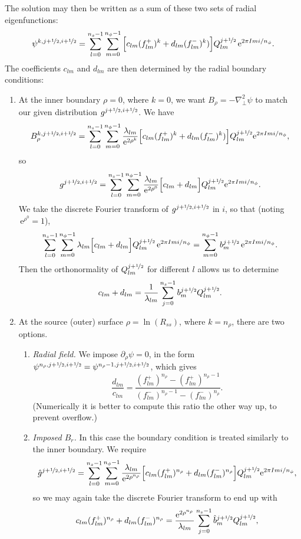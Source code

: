 \documentclass[11pt]{article}
\newcommand{\dy}{\partial}
\newcommand{\nr}{n_\rho}
\newcommand{\ns}{n_s}
\newcommand{\nph}{n_\phi}
\newcommand{\half}{\nicefrac{1}{2}}
\newcommand{\ex}{\,\mathrm{e}}
\begin{document}
The solution may then be written as a sum of these two sets of radial eigenfunctions:
\begin{equation}
\psi^{k,j+\half,i+\half} = \sum_{l=0}^{\ns-1}\sum_{m=0}^{\nph-1}\Big[c_{lm}(f_{lm}^+)^k + d_{lm}(f_{lm}^-)^k) \Big] Q_{lm}^{j+\half}\ex^{2\pi I mi/\nph}.
\label{eqn:psisum}
\end{equation}
The coefficients $c_{lm}$ and $d_{lm}$ are then determined by the radial boundary conditions:
\begin{enumerate}
\item At the inner boundary $\rho = 0$, where $k=0$, we want  $B_\rho = -\nabla^2_\perp\psi$ to match our given distribution $g^{j+\half,i+\half}$.
We have
\[
B_\rho^{k,j+\half,i+\half} = \sum_{l=0}^{\ns-1}\sum_{m=0}^{\nph-1}\frac{\lambda_{lm}}{\mathrm{e}^{2\rho^k}}\Big[c_{lm}(f_{lm}^+)^k + d_{lm}(f_{lm}^-)^k) \Big] Q_{lm}^{j+\half}\mathrm{e}^{2\pi I mi/\nph},
\]
so
\[
g^{j+\half,i+\half} = \sum_{l=0}^{\ns-1}\sum_{m=0}^{\nph-1}\frac{\lambda_{lm}}{\mathrm{e}^{2\rho^0}}\Big[c_{lm} + d_{lm}\Big] Q_{lm}^{j+\half}\mathrm{e}^{2\pi I mi/\nph}.
\]
We take the discrete Fourier transform of $g^{j+\half,i+\half}$ in $i$, so that (noting $\ex^{\rho^0}=1$),
\[
\sum_{l=0}^{\ns-1}\sum_{m=0}^{\nph-1}\lambda_{lm}
\Big[c_{lm} + d_{lm}\Big] Q_{lm}^{j+\half}\,\mathrm{e}^{2\pi I mi/\nph} = \sum_{m=0}^{\nph-1}b_m^{j+\half}\,\mathrm{e}^{2\pi I mi/\nph}.
\]
Then the orthonormality of $Q_{lm}^{j+\half}$ for different $l$ allows us to determine
\begin{equation}
c_{lm} + d_{lm} = \frac{1}{\lambda_{lm}}\sum_{j=0}^{\ns-1}b_m^{j+\half}Q_{lm}^{j+\half}.
\label{eqn:dc2}
\end{equation}
\item At the source (outer) surface $\rho=\ln(R_{ss})$, where $k=\nr$, there are two options.
\begin{enumerate}
\item  \emph{Radial field.} We impose $\dy_\rho\psi = 0$, in the form $\psi^{\nr,j+\half,i+\half}=\psi^{\nr-1,j+\half,i+\half}$, which gives
\begin{equation}
\frac{d_{lm}}{c_{lm}} = \frac{(f_{lm}^+)^{\nr} - (f_{lm}^+)^{\nr-1}}{(f_{lm}^-)^{\nr-1} - (f_{lm}^-)^{\nr}}.
\label{eqn:dc1}
\end{equation}
(Numerically it is better to compute this ratio the other way up, to prevent overflow.)
\item  \emph{Imposed $B_r$.} In this case the boundary condition is treated similarly to the inner boundary. We require
\[
\hat{g}^{j+\half,i+\half} = \sum_{l=0}^{\ns-1}\sum_{m=0}^{\nph-1}\frac{\lambda_{lm}}{\mathrm{e}^{2\rho^{n_\rho}}}\Big[c_{lm}(f_{lm}^+)^{n_\rho} + d_{lm}(f_{lm}^-)^{n_\rho}\Big] Q_{lm}^{j+\half}\mathrm{e}^{2\pi I mi/\nph},
\]
so we may again take the discrete Fourier transform to end up with
\begin{equation}
c_{lm}(f_{lm}^+)^{n_\rho} + d_{lm}(f_{lm}^-)^{n_\rho} = \frac{\mathrm{e}^{2\rho^{n_\rho}}}{\lambda_{lm}}\sum_{j=0}^{\ns-1}\hat{b}_m^{j+\half}Q_{lm}^{j+\half},
\label{eqn:dc3}
\end{equation}
\end{enumerate}
\end{enumerate}
\end{document}

